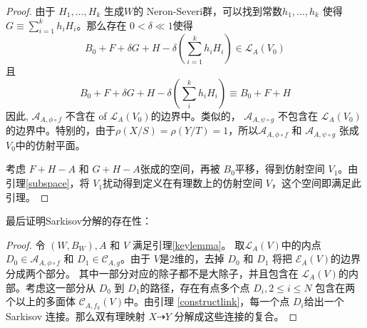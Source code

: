 \begin{proof}
  由于 $H_{1},\ldots ,H_{k}$ 生成$W$的 Neron-Severi群，可以找到常数$h_{1},\ldots ,h_{k}$ 使得 $G \equiv \sum^{k}_{i=1} h_{i}H_{i}$。那么存在 $0< \delta\ll 1$使得 
  \[B_{0}+F+\delta G+H- \delta(\sum_{i=1}^{k} h_{i}H_{i}) \in \mathcal{L}_{A}(V_{0})\]
  且
  \[ B_{0}+F+\delta G+H-\delta (\sum_i^k h_{i}H_{i}) \equiv B_{0}+F+H \]
  因此, $\mathcal{A}_{A,\phi\circ f}$ 不含在 of $\mathcal{L}_{A}(V_{0})$的边界中。类似的， $\mathcal{A}_{A,\psi\circ g}$ 不包含在 $\mathcal{L}_{A}(V_{0})$的边界中。特别的，由于$\rho(X/S)=\rho(Y/T)=1$，所以$\mathcal{A}_{A,\phi\circ f}$ 和   $\mathcal{A}_{A,\psi\circ g}$ 张成 $V_{0}$中的仿射平面。

  考虑 $F+H-A$ 和 $G+H-A$张成的空间，再被 $B_{0}$平移，得到仿射空间 $V_{1}$。由引理\ref{subspace}，将 $V_{1}$扰动得到定义在有理数上的仿射空间 $V$，这个空间即满足此引理。
\end{proof}

最后证明Sarkisov分解的存在性：
\begin{proof}
  令 $(W,B_{W}),A $ 和 $V$ 满足引理\ref{keylemma}。 取$ \mathcal{L}_A(V) $中的内点$ D_{0} \in \mathcal{A}_{A,\phi\circ f} $  和 $ D_1\in \mathcal{C}_{A,g} $。由于 $ V $是2维的，去掉 $ D_0 $ 和 $ D_1 $ 将把 $ \mathcal{E}_A(V) $的边界分成两个部分。
  其中一部分对应的除子都不是大除子，并且包含在 $ \mathcal{L}_A(V) $的内部。考虑这一部分从 $ D_0 $ 到 $ D_1 $的路径，存在有点多个点 $ D_i , 2\leqslant i\leqslant N $ 包含在两个以上的多面体 $ \mathcal{C}_{A,f_{k}}(V) $中。由引理 \ref{constructlink}，每一个点 $ D_i $给出一个 Sarkisov 连接。那么双有理映射 $X \dashrightarrow Y$ 分解成这些连接的复合。 \end{proof}
